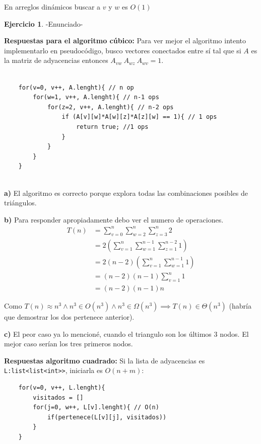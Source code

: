 \documentclass[12pt]{article}
\theoremstyle{definition}
\newtheorem{ejercicio}{Ejercicio}
\begin{document}
En arreglos dinámicos buscar a $v$ y $w$ es $O(1)$

\begin{ejercicio}
    -Enunciado-
\end{ejercicio}
\textbf{Respuestas para el algoritmo cúbico:}
Para ver mejor el algoritmo intento implementarlo en pseudocódigo, busco vectores conectados
entre sí tal que si $A$ es la matriz de adyacencias entonces $A_{vw} \ A_{wz} \ A_{wv} = 1$.
\begin{verbatim}
    
    for(v=0, v++, A.lenght){ // n op
        for(w=1, v++, A.lenght){ // n-1 ops
            for(z=2, v++, A.lenght){ // n-2 ops
                if (A[v][w]*A[w][z]*A[z][w] == 1){ // 1 ops
                    return true; //1 ops
                }
            }
        }
    }
    
\end{verbatim}

\textbf{a)} El algoritmo es correcto porque explora todas las combinaciones posibles de triángulos.

\textbf{b)} Para responder apropiadamente debo ver el numero de operaciones.
\begin{align*}
    T(n) &=  \sum_{v=0}^{n} \sum_{w=2}^{n} \sum_{z=3}^{n} 2 \\
    &= 2(\sum_{v=1}^{n} \sum_{w=1}^{n-1} \sum_{z=1}^{n-2} 1) \\
    &= 2 (n-2) (\sum_{v=1}^{n} \sum_{w=1}^{n-1}1) \\
    &= (n-2) (n-1)\sum_{v=1}^{n} 1 \\
    &= (n-2) (n-1) n
\end{align*}

Como $T(n) \approx n^3 \land n^3 \in O(n^3) \land n^3\in \Omega(n^3) \implies T(n) \in \Theta(n^3)$ (habría
que demostrar los dos pertenece anterior).

\textbf{c)} El peor caso ya lo mencioné, cuando el triangulo son los últimos 3 nodos. El mejor caso serían
los tres primeros nodos.

\textbf{Respuestas algoritmo cuadrado:}
Si la lista de adyacencias es \lstinline|L:list<list<int>>|, iniciarla es $O(n+m)$:
\begin{verbatim}
    for(v=0, v++, L.lenght){ 
        visitados = []
        for(j=0, w++, L[v].lenght){ // O(n)
            if(pertenece(L[v][j], visitados))
        }
    }
\end{verbatim}
\end{document}
